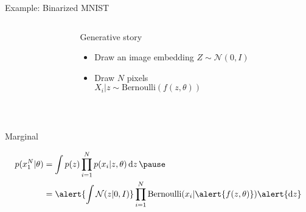 \documentclass[14pt, aspectratio=169]{beamer}
\begin{document}
\begin{frame}{Example: Binarized MNIST}


\begin{columns}
	\begin{column}{0.2\textwidth}
    \end{column}
    \begin{column}{0.75\textwidth}
    	Generative story 
    	\begin{itemize}
			\item Draw an image embedding $Z \sim \mathcal N(0, I)$
			\item Draw $N$ pixels\\
			$X_i|z \sim \text{Bernoulli}(f(z, \theta))$
		\end{itemize}
    \end{column}
    \end{columns}
    
    
    ~
    
	Marginal \pause
	\begin{small}
    \begin{equation*}
	\begin{aligned}						
		p(x_1^N|\theta) &= \int p(z) \prod_{i=1}^N p(x_i|z, \theta) \dd{z} \pause \\
		&= \alert{\int \mathcal N(z|0, I)} \prod_{i=1}^N \text{Bernoulli}(x_i|\alert{f(z, \theta)}) \alert{\dd{z}}
	\end{aligned}
	\end{equation*}
	\end{small}

\end{frame}
\end{document}
